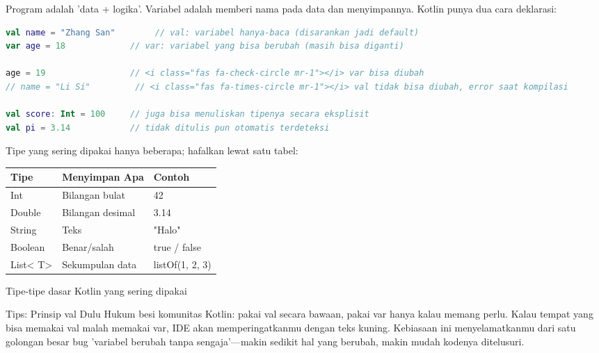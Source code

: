 


Program adalah 'data + logika'. Variabel adalah memberi nama pada data dan menyimpannya. Kotlin punya dua cara deklarasi:

\begin{lstlisting}[language=Kotlin]
val name = "Zhang San"        // val: variabel hanya-baca (disarankan jadi default)
var age = 18             // var: variabel yang bisa berubah (masih bisa diganti)

age = 19                 // <i class="fas fa-check-circle mr-1"></i> var bisa diubah
// name = "Li Si"         // <i class="fas fa-times-circle mr-1"></i> val tidak bisa diubah, error saat kompilasi

val score: Int = 100     // juga bisa menuliskan tipenya secara eksplisit
val pi = 3.14            // tidak ditulis pun otomatis terdeteksi
\end{lstlisting}

Tipe yang sering dipakai hanya beberapa; hafalkan lewat satu tabel:

\begin{center}
\begin{tabularx}{\linewidth}{|X|X|X|}
\hline
\textbf{Tipe} & \textbf{Menyimpan Apa} & \textbf{Contoh} \tabularnewline
\hline
Int & Bilangan bulat & 42 \tabularnewline
Double & Bilangan desimal & 3.14 \tabularnewline
String & Teks & "Halo" \tabularnewline
Boolean & Benar/salah & true / false \tabularnewline
List< T> & Sekumpulan data & listOf(1, 2, 3) \tabularnewline
\hline
\end{tabularx}
\end{center}

\begin{center}\small\color{gray}Tipe-tipe dasar Kotlin yang sering dipakai\end{center}

\begin{tcbinfo}{Tips: Prinsip val Dulu}
Hukum besi komunitas Kotlin: pakai val secara bawaan, pakai var hanya kalau memang perlu. Kalau tempat yang bisa memakai val malah memakai var, IDE akan memperingatkanmu dengan teks kuning. Kebiasaan ini menyelamatkanmu dari satu golongan besar bug 'variabel berubah tanpa sengaja'—makin sedikit hal yang berubah, makin mudah kodenya ditelusuri.

\end{tcbinfo}

